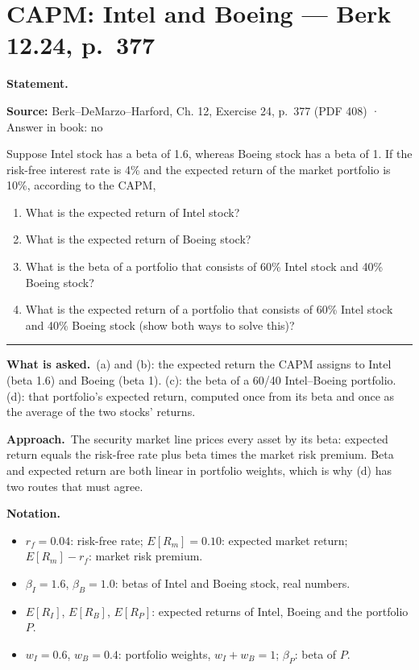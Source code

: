 \documentclass[11pt,a4paper]{article}
\numberwithin{equation}{section}
\newenvironment{notation}{\par\noindent\textbf{Notation.}\begin{itemize}[leftmargin=1.4em]}{\end{itemize}}
\newcommand{\asked}{\par\medskip\noindent\textbf{What is asked.}~}
\newcommand{\approach}{\par\smallskip\noindent\textbf{Approach.}~}
\newcommand{\stmtbegin}{\par\medskip\noindent\textbf{Statement.}\par\nopagebreak\begingroup\small\setlength{\tabcolsep}{3pt}\sloppy}
\newcommand{\stmtend}{\par\endgroup\nopagebreak\noindent\rule{\linewidth}{0.4pt}\par\medskip}
\begin{document}
\section{CAPM: Intel and Boeing --- Berk 12.24, p.~377}
\stmtbegin
\textbf{Source:} Berk--DeMarzo--Harford, Ch. 12, Exercise 24, p.~377 (PDF 408) · Answer in book: no

Suppose Intel stock has a beta of 1.6, whereas Boeing stock has a beta of 1. If the risk-free
interest rate is 4\% and the expected return of the market portfolio is 10\%, according to the CAPM,

\begin{enumerate}
\def\labelenumi{\alph{enumi}.}
\item
  What is the expected return of Intel stock?
\item
  What is the expected return of Boeing stock?
\item
  What is the beta of a portfolio that consists of 60\% Intel stock and 40\% Boeing stock?
\item
  What is the expected return of a portfolio that consists of 60\% Intel stock and 40\% Boeing stock
  (show both ways to solve this)?
\end{enumerate}
\stmtend

\asked (a) and (b): the expected return the CAPM assigns to Intel (beta 1.6) and Boeing (beta 1).
(c): the beta of a 60/40 Intel--Boeing portfolio. (d): that portfolio's expected return,
computed once from its beta and once as the average of the two stocks' returns.

\approach The security market line prices every asset by its beta: expected return equals the
risk-free rate plus beta times the market risk premium. Beta and expected return are both
linear in portfolio weights, which is why (d) has two routes that must agree.

\begin{notation}
  \item $r_f=0.04$: risk-free rate; $E[R_m]=0.10$: expected market return; $E[R_m]-r_f$: market risk premium.
  \item $\beta_I=1.6$, $\beta_B=1.0$: betas of Intel and Boeing stock, real numbers.
  \item $E[R_I]$, $E[R_B]$, $E[R_P]$: expected returns of Intel, Boeing and the portfolio $P$.
  \item $w_I=0.6$, $w_B=0.4$: portfolio weights, $w_I+w_B=1$; $\beta_P$: beta of $P$.
\end{notation}
\end{document}
